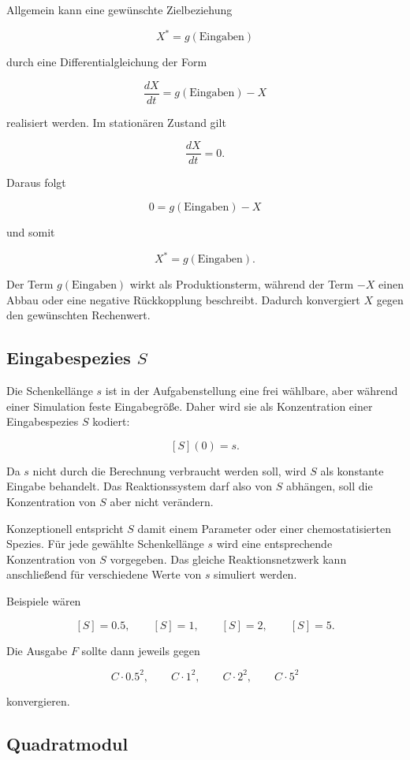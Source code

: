 Allgemein kann eine gewünschte Zielbeziehung

\[
X^* = g(\text{Eingaben})
\]

durch eine Differentialgleichung der Form

\[
\frac{dX}{dt}
=
g(\text{Eingaben})-X
\]

realisiert werden. Im stationären Zustand gilt

\[
\frac{dX}{dt}=0.
\]

Daraus folgt

\[
0=g(\text{Eingaben})-X
\]

und somit

\[
X^*=g(\text{Eingaben}).
\]

Der Term \(g(\text{Eingaben})\) wirkt als Produktionsterm, während der Term
\(-X\) einen Abbau oder eine negative Rückkopplung beschreibt. Dadurch
konvergiert \(X\) gegen den gewünschten Rechenwert.

\subsection{Eingabespezies \(S\)}

Die Schenkellänge \(s\) ist in der Aufgabenstellung eine frei wählbare,
aber während einer Simulation feste Eingabegröße. Daher wird sie als
Konzentration einer Eingabespezies \(S\) kodiert:

\[
[S](0)=s.
\]

Da \(s\) nicht durch die Berechnung verbraucht werden soll, wird \(S\) als
konstante Eingabe behandelt. Das Reaktionssystem darf also von \(S\)
abhängen, soll die Konzentration von \(S\) aber nicht verändern.

Konzeptionell entspricht \(S\) damit einem Parameter oder einer
chemostatisierten Spezies. Für jede gewählte Schenkellänge \(s\) wird eine
entsprechende Konzentration von \(S\) vorgegeben. Das gleiche
Reaktionsnetzwerk kann anschließend für verschiedene Werte von \(s\)
simuliert werden.

Beispiele wären

\[
[S]=0.5,\qquad [S]=1,\qquad [S]=2,\qquad [S]=5.
\]

Die Ausgabe \(F\) sollte dann jeweils gegen

\[
C\cdot 0.5^2,\qquad
C\cdot 1^2,\qquad
C\cdot 2^2,\qquad
C\cdot 5^2
\]

konvergieren.

\subsection{Quadratmodul}

